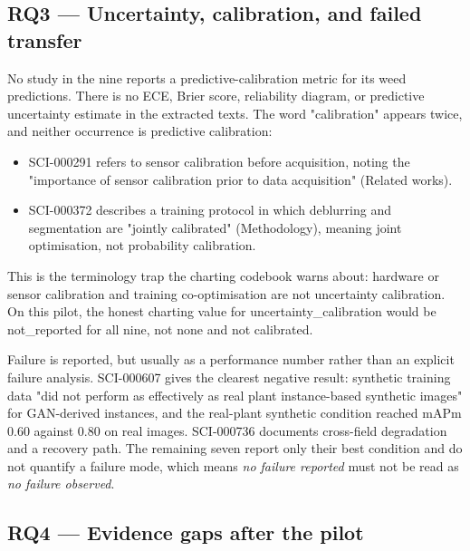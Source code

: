 \documentclass{article}
\begin{document}
\subsection{RQ3 — Uncertainty, calibration, and failed transfer}

\textit{}No study in the nine reports a predictive-calibration metric for its weed
predictions.\textit{} There is no ECE, Brier score, reliability diagram, or predictive
uncertainty estimate in the extracted texts. The word "calibration" appears twice,
and neither occurrence is predictive calibration:

\begin{itemize}
\item SCI-000291 refers to sensor calibration before acquisition, noting the
  "importance of sensor calibration prior to data acquisition" (Related works).
\item SCI-000372 describes a training protocol in which deblurring and segmentation
  are "jointly calibrated" (Methodology), meaning joint optimisation, not
  probability calibration.
\end{itemize}

This is the terminology trap the charting codebook warns about: hardware or sensor
calibration and training co-optimisation are not uncertainty calibration. On this
pilot, the honest charting value for uncertainty\_calibration would be
not\_reported for all nine, not none and not calibrated.

\textit{}Failure is reported, but usually as a performance number rather than an explicit
failure analysis.\textit{} SCI-000607 gives the clearest negative result: synthetic
training data "did not perform as effectively as real plant instance-based synthetic
images" for GAN-derived instances, and the real-plant synthetic condition reached
mAPm 0.60 against 0.80 on real images. SCI-000736 documents cross-field
degradation and a recovery path. The remaining seven report only their best
condition and do not quantify a failure mode, which means \textit{no failure reported} must
not be read as \textit{no failure observed}.

\subsection{RQ4 — Evidence gaps after the pilot}
\end{document}

